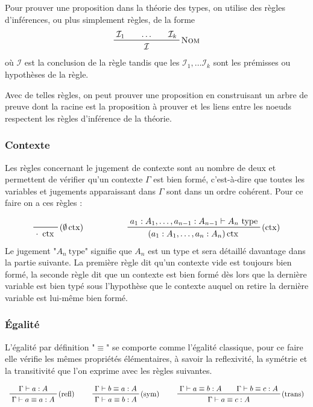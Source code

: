 \documentclass[../../rapport.tex]{subfiles}
\begin{document}
  Pour prouver une proposition dans la théorie des types, on utilise des règles d'inférences, ou plus simplement règles, de la forme
  $$
  \prfinterspace=2em
  \prftree[r]{\textsc{Nom}}{\mathcal I_1}{\hdots}{\mathcal I_k}{\mathcal I}
  $$
  où $\mathcal I$ est la conclusion de la règle tandis que les $\mathcal I_1, \hdots \mathcal I_k$
  sont les prémisses ou hypothèses de la règle.

  Avec de telles règles, on peut prouver une proposition en construisant un arbre de preuve
  dont la racine est la proposition à prouver et les liens entre les noeuds respectent les règles d'inférence de la théorie.

  \subsubsection{Contexte}

  Les règles concernant le jugement de contexte sont au nombre de deux et permettent de vérifier qu'un contexte $\Gamma$ est bien formé,
  c'est-à-dire que toutes les variables et jugements apparaissant dans $\Gamma$ sont dans un ordre cohérent.
  Pour ce faire on a ces règles :

  $$
  \begin{array}{cc}
    \prfbyaxiom{($\emptyset\ctx$)}{\cdot\ \ctx} \hspace{1.5cm}
    & \prftree[r]{($\ctx$)}{a_1 : A_1, \hdots, a_{n-1} : A_{n-1} \vdash A_n\ \text{type}}
      {(a_1 : A_1, \hdots, a_n : A_n) \ctx}
  \end{array}
  $$
  Le jugement "$A_n\ \text{type}$" signifie que $A_n$ est un type et sera détaillé davantage dans la partie suivante.
  La première règle dit qu'un contexte vide est toujours bien formé, la seconde règle dit que un contexte est bien formé
  dès lors que la dernière variable est bien typé sous l'hypothèse que le contexte auquel on retire la dernière variable
  est lui-même bien formé.

  \subsubsection{Égalité}

  L'égalité par définition "$\equiv$" se comporte comme l'égalité classique, pour ce faire elle vérifie les mêmes propriétés élémentaires,
  à savoir la reflexivité, la symétrie et la transitivité que l'on exprime avec les règles suivantes.

  $$
  \prfinterspace=2em
  \begin{array}{ccc}
    \prftree[r]{(refl)}{\Gamma \vdash a : A}{\Gamma \vdash a \equiv a : A} \hspace{0.5cm}
    & \prftree[r]{(sym)} {\Gamma \vdash b \equiv a : A}{\Gamma \vdash a \equiv b : A} \hspace{0.5cm}
    & \prftree[r]{(trans)}{\Gamma \vdash a \equiv b : A}{\Gamma \vdash b \equiv c : A}{\Gamma \vdash a \equiv c : A}
  \end{array}
  $$
\end{document}

